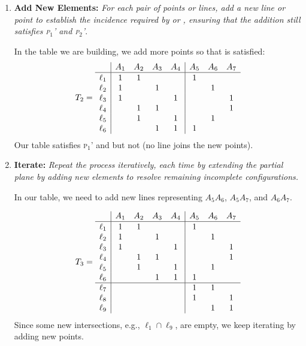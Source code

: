 \begin{xmpl}
\begin{enumerate}[1.]
        \item \textbf{Add New Elements:} \textit{For each pair of points or lines, add a new line or point to establish the incidence required by\/  or\/ , ensuring that the addition still satisfies\/ {\upshape\textsc{p$_1$\!'}} and\/ {\upshape\textsc{p$_2$\!'}}}.
        
        In the table we are building, we add more points so that  is satisfied:
        \small
        \setlength{\tabcolsep}{3pt}
        \begin{align}\label{eq:T2}
            T_2 = \begin{array}{l|cccc|ccc}
                &A_1 &A_2 &A_3 &A_4 &A_5 &A_6 &A_7\\
                \hline\rule{0pt}{9pt}
                \ell_1 &1 &1 &&&1\\
                \ell_2 &1 &&1 &&&1\\
                \ell_3 &1 &&&1 &&&1\\
                \ell_4 &&1 &1 &&&&1\\
                \ell_5 &&1 &&1 &&1\\
                \ell_6 &&&1 &1 &1
            \end{array}            
        \end{align}
        \normalsize
        Our table satisfies \textsc{p$_1$\!'} and  but not  (no line joins the new points).

        \item \textbf{Iterate:} \textit{Repeat the process iteratively, each time by extending the partial plane by adding new elements to resolve remaining incomplete configurations.}

        In our table, we need to add new lines representing $A_5A_6$, $A_5A_7$, and $A_6A_7$.

        \vspace{-2\parskip}
        \small
        \setlength{\tabcolsep}{3pt}
        \begin{align}\label{eq:T3}
            T_3=\begin{array}{l|cccc|ccc}
                &A_1 &A_2 &A_3 &A_4 &A_5 &A_6 &A_7\\
                \hline\rule{0pt}{9pt}
                \ell_1 &1 &1 &&&1\\
                \ell_2 &1 &&1 &&&1\\
                \ell_3 &1 &&&1 &&&1\\
                \ell_4 &&1 &1 &&&&1\\
                \ell_5 &&1 &&1 &&1\\
                \ell_6 &&&1 &1 &1\\
                \hline
                \ell_7 &&&&&1 &1\\
                \ell_8 &&&&&1 &&1\\
                \ell_9 &&&&&&1 &1
            \end{array}
        \end{align}
        \normalsize
        Since some new intersections, e.g., $\ell_1\cap\ell_9$, are empty, we keep iterating by adding new points.


\end{enumerate}
\end{xmpl}
